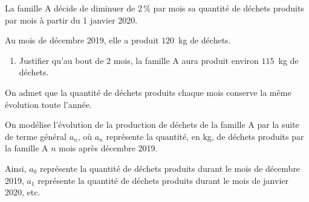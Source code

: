\medskip

La famille A décide de diminuer de 2\,\% par mois sa quantité de déchets produits par mois à partir du 1 janvier 2020.

Au mois de décembre 2019, elle a produit $120$~kg de déchets.

\medskip

\begin{enumerate}
\item Justifier qu'au bout de 2 mois, la famille A aura produit environ $115$~kg de déchets.
\end{enumerate}

On admet que la quantité de déchets produits chaque mois conserve la même évolution toute l'année.

On modélise l'évolution de la production de déchets de la famille A par la suite de terme général $a_n$, où $a_n$ représente la quantité, en kg, de déchets produits par la famille A $n$ mois après décembre 2019.

Ainsi, $a_0$ représente la quantité de déchets produits durant le mois de décembre 2019, $a_1$ représente la quantité de déchets produits durant le mois de janvier 2020, etc.

